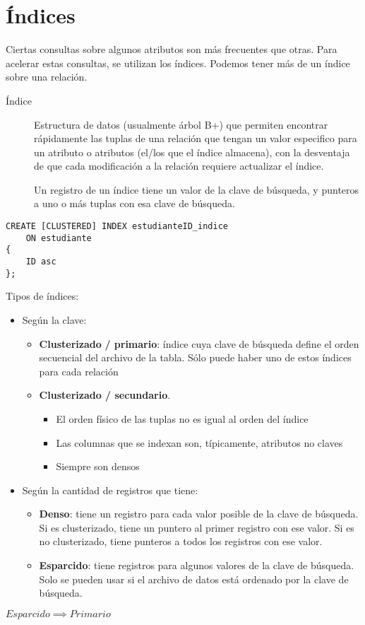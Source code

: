 \documentclass[a4paper, twoside]{article}
\begin{document}
\section{Índices}

Ciertas consultas sobre algunos atributos son más frecuentes que otras.
Para acelerar estas consultas, se utilizan los índices. Podemos tener
más de un índice sobre una relación.
\begin{description}
\item [{Índice}] Estructura de datos (usualmente árbol B+) que permiten
encontrar rápidamente las tuplas de una relación que tengan un valor
especifico para un atributo o atributos (el/los que el índice almacena),
con la desventaja de que cada modificación a la relación requiere
actualizar el índice.


Un registro de un índice tiene un valor de la clave de búsqueda, y
punteros a uno o más tuplas con esa clave de búsqueda.

\end{description}
\begin{lstlisting}
CREATE [CLUSTERED] INDEX estudianteID_indice
	ON estudiante
{
	ID asc
};
\end{lstlisting}


Tipos de índices:
\begin{itemize}
\item Según la clave:

\begin{itemize}
\item \textbf{Clusterizado} \textbf{/ primario}: índice cuya clave de búsqueda
define el orden secuencial del archivo de la tabla. Sólo puede haber
uno de estos índices para cada relación
\item \textbf{Clusterizado / secundario}.

\begin{itemize}
\item El orden físico de las tuplas no es igual al orden del índice
\item Las columnas que se indexan son, típicamente, atributos no claves
\item Siempre son densos
\end{itemize}
\end{itemize}
\item Según la cantidad de registros que tiene:

\begin{itemize}
\item \textbf{Denso}: tiene un registro para cada valor posible de la clave
de búsqueda. Si es clusterizado, tiene un puntero al primer registro
con ese valor. Si es no clusterizado, tiene punteros a todos los registros
con ese valor.
\item \textbf{Esparcido}: tiene registros para algunos valores de la clave
de búsqueda. Solo se pueden usar si el archivo de datos está ordenado
por la clave de búsqueda.
\end{itemize}
\end{itemize}
\noindent \begin{center}
$Esparcido\implies Primario$
\par\end{center}
\end{document}
